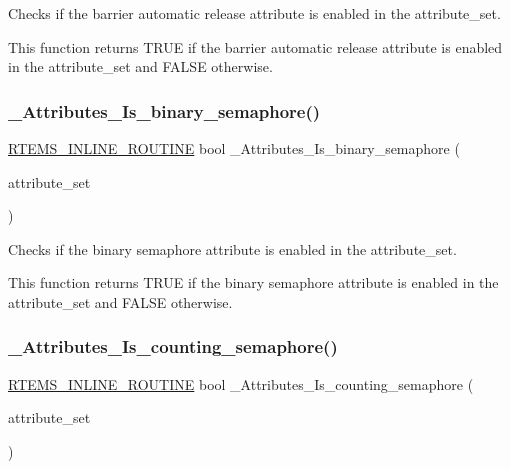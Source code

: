 Checks if the barrier automatic release attribute is enabled in the attribute\+\_\+set. 

This function returns T\+R\+UE if the barrier automatic release attribute is enabled in the attribute\+\_\+set and F\+A\+L\+SE otherwise. \mbox{\label{group__ClassicAttributesImpl_gae1c4c3dcfbabfb1381aae7267389b11e}} 
\subsubsection{\texorpdfstring{\_Attributes\_Is\_binary\_semaphore()}{\_Attributes\_Is\_binary\_semaphore()}}
{\footnotesize\ttfamily \mbox{\hyperlink{group__RTEMSScoreBaseDefs_gac216239df231d5dbd15e3520b0b9313f}{R\+T\+E\+M\+S\+\_\+\+I\+N\+L\+I\+N\+E\+\_\+\+R\+O\+U\+T\+I\+NE}} bool \+\_\+\+Attributes\+\_\+\+Is\+\_\+binary\+\_\+semaphore (\begin{DoxyParamCaption}\item[{\mbox{\hyperlink{group__ClassicAttributes_gaea40313cf78ed843e09c4315d0a10f79}{rtems\+\_\+attribute}}}]{attribute\+\_\+set }\end{DoxyParamCaption})}



Checks if the binary semaphore attribute is enabled in the attribute\+\_\+set. 

This function returns T\+R\+UE if the binary semaphore attribute is enabled in the attribute\+\_\+set and F\+A\+L\+SE otherwise. \mbox{\label{group__ClassicAttributesImpl_gafcc4fe0234a43ef490cebb3f45fac48d}} 
\subsubsection{\texorpdfstring{\_Attributes\_Is\_counting\_semaphore()}{\_Attributes\_Is\_counting\_semaphore()}}
{\footnotesize\ttfamily \mbox{\hyperlink{group__RTEMSScoreBaseDefs_gac216239df231d5dbd15e3520b0b9313f}{R\+T\+E\+M\+S\+\_\+\+I\+N\+L\+I\+N\+E\+\_\+\+R\+O\+U\+T\+I\+NE}} bool \+\_\+\+Attributes\+\_\+\+Is\+\_\+counting\+\_\+semaphore (\begin{DoxyParamCaption}\item[{\mbox{\hyperlink{group__ClassicAttributes_gaea40313cf78ed843e09c4315d0a10f79}{rtems\+\_\+attribute}}}]{attribute\+\_\+set }\end{DoxyParamCaption})}



